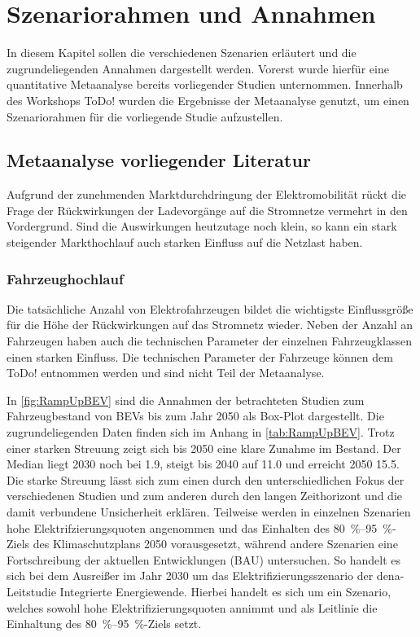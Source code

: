 
\section{Szenariorahmen und Annahmen}\label{chap:Szenariorahmen}

In diesem Kapitel sollen die verschiedenen Szenarien erläutert und die zugrundeliegenden Annahmen dargestellt werden.
Vorerst wurde hierfür eine quantitative Metaanalyse bereits vorliegender Studien unternommen.
Innerhalb des Workshops ToDo! wurden die Ergebnisse der Metaanalyse genutzt, um einen Szenariorahmen für die vorliegende Studie aufzustellen.

\subsection{Metaanalyse vorliegender Literatur}\label{chap:Metaanalyse}

Aufgrund der zunehmenden Marktdurchdringung der Elektromobilität rückt die Frage der Rückwirkungen der Ladevorgänge auf die Stromnetze vermehrt in den Vordergrund.
Sind die Auswirkungen heutzutage noch klein, so kann ein stark steigender Markthochlauf auch starken Einfluss auf die Netzlast haben.

\subsubsection{Fahrzeughochlauf}

Die tatsächliche Anzahl von Elektrofahrzeugen bildet die wichtigste Einflussgröße für die Höhe der Rückwirkungen auf das Stromnetz wieder.
Neben der Anzahl an Fahrzeugen haben auch die technischen Parameter der einzelnen Fahrzeugklassen einen starken Einfluss.
Die technischen Parameter der Fahrzeuge können dem ToDo! entnommen werden und sind nicht Teil der Metaanalyse.



In \autoref{fig:RampUpBEV} sind die Annahmen der betrachteten Studien zum Fahrzeugbestand von \glspl{BEV} bis zum Jahr \num{2050} als Box-Plot dargestellt.
Die zugrundeliegenden Daten finden sich im Anhang in \autoref{tab:RampUpBEV}.
Trotz einer starken Streuung zeigt sich bis \num{2050} eine klare Zunahme im Bestand.
Der Median liegt 2030 noch bei \SI{1.9}{\MioStk}, steigt bis \num{2040} auf \SI{11.0}{\MioStk} und erreicht \num{2050} \SI{15.5}{\MioStk}.
Die starke Streuung lässt sich zum einen durch den unterschiedlichen Fokus der verschiedenen Studien und zum anderen durch den langen Zeithorizont und die damit verbundene Unsicherheit erklären.
Teilweise werden in einzelnen Szenarien hohe Elektrifzierungsquoten angenommen und das Einhalten des \SIrange[range-phrase=~{--}~]{80}{95}{\percent}-Ziels des Klimaschutzplans \num{2050} vorausgesetzt, während andere Szenarien eine Fortschreibung der aktuellen Entwicklungen (\gls{BAU}) untersuchen.
So handelt es sich bei dem Ausreißer im Jahr 2030 um das Elektrifizierungsszenario der dena-Leitstudie Integrierte Energiewende.
Hierbei handelt es sich um ein Szenario, welches sowohl hohe Elektrifizierungsquoten annimmt und als Leitlinie die Einhaltung des  \SIrange[range-phrase=~{--}~]{80}{95}{\percent}-Ziels setzt.\medskip

